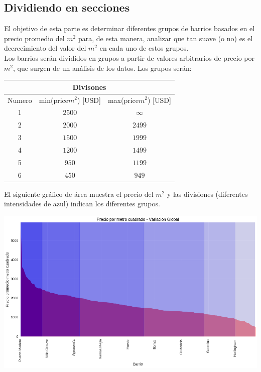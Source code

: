 \documentclass[a4paper, 10pt]{article}
\newcommand\tab[1][0.5cm]{\hspace*{#1}}
\begin{document}
			\subsection{Dividiendo en secciones}
				El objetivo de esta parte es determinar diferentes grupos de barrios basados en el precio promedio del $m^2$
				para, de esta manera, analizar que tan suave (o no) es el decrecimiento del valor del $m^2$ en cada uno de
				estos grupos. \\
				\tab Los barrios serán divididos en grupos a partir de valores arbitrarios de precio por $m^2$, que surgen de
				un análisis de los datos. Los grupos serán:
				\begin{center}
					\begin{tabular}{ |c|c|c| }
						\hline
						\multicolumn{3}{|c|}{Divisones} \\
						\hline
						\hline
						Numero & min(price$m^2$) [USD] & max(price$m^2$) [USD] \\
						\hline
						1 & $2500$ & $\infty$ \\
						\hline
						2 & $2000$ & $2499$ \\
						\hline
						3 & $1500$ & $1999$ \\	
						\hline
						4 & $1200$ & $1499$ \\
						\hline
						5 & $950$ & $1199$ \\		
						\hline
						6 & $450$ & $949$ \\			
						\hline
					\end{tabular}
				\end{center}
				\tab El siguiente gráfico de área muestra el precio del $m^2$ y las divisiones (diferentes intensidades de
				azul) indican los diferentes grupos.
				\begin{center}
   	    				\includegraphics[width=\textwidth]{images/m2HoodsDivision}
			  	\end{center}
\end{document}

